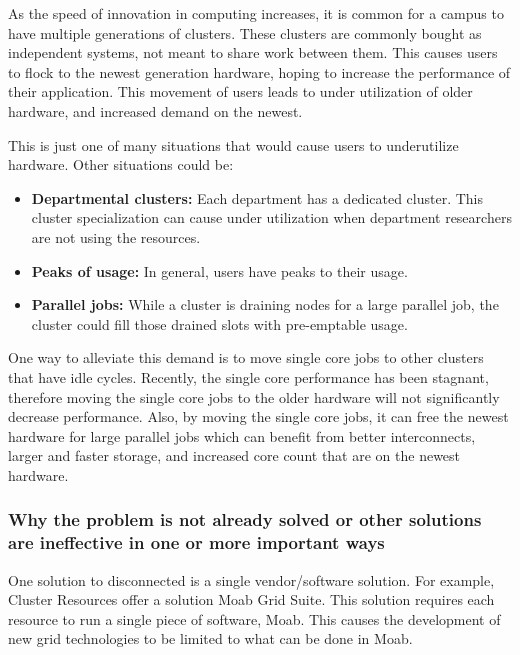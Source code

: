 \documentclass[11pt]{article}
\begin{document}
As the speed of innovation in computing increases, it is common for a campus to have multiple generations of clusters.  These clusters are commonly bought as independent systems, not meant to share work between them.  This causes users to flock to the newest generation hardware, hoping to increase the performance of their application.  This movement of users leads to under utilization of older hardware, and increased demand on the newest.

This is just one of many situations that would cause users to underutilize hardware.  Other situations could be:

\begin{itemize}
\item \textbf{Departmental clusters:}  Each department has a dedicated cluster.  This cluster specialization can cause under utilization when department researchers are not using the resources.
\item \textbf{Peaks of usage:} In general, users have peaks to their usage.
\item \textbf{Parallel jobs:} While a cluster is draining nodes for a large parallel job, the cluster could fill those drained slots with pre-emptable usage.
\end{itemize}

One way to alleviate this demand is to move single core jobs to other clusters that have idle cycles.  Recently, the single core performance has been stagnant, therefore moving the single core jobs to the older hardware will not significantly decrease performance.  Also, by moving the single core jobs, it can free the newest hardware for large parallel jobs which can benefit from better interconnects, larger and faster storage, and increased core count that are on the newest hardware.




\subsubsection* {Why the problem is not already solved or other solutions 
are ineffective in one or more important ways}



One solution to disconnected is a single vendor/software solution.  For example, Cluster Resources offer a solution Moab Grid Suite\cite{website:moabgrid}.  This solution requires each resource to run a single piece of software, Moab.  This causes the development of new grid technologies to be limited to what can be done in Moab.
\end{document}
